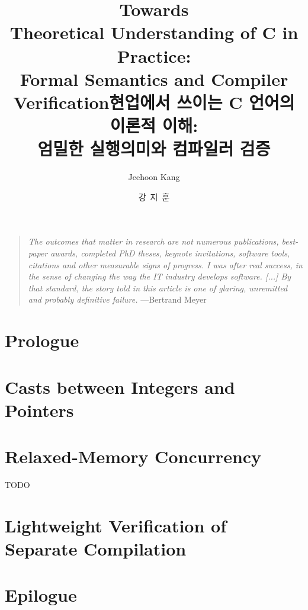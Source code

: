 \documentclass[oneside,phd]{snuthesis}
\title{Towards \\ Theoretical Understanding of C in Practice: \\ Formal Semantics and Compiler Verification}
\title*{현업에서 쓰이는 C 언어의 이론적 이해: \\ 엄밀한 실행의미와 컴파일러 검증}
\author{Jeehoon Kang}
\author*{강~지~훈} %
\begin{document}
\makefrontcover
\makefrontcover
\makeapproval

\cleardoublepage
{}



\begin{quotation}
  \emph{The outcomes that matter in research are not numerous publications, best-paper awards,
    completed PhD theses, keynote invitations, software tools, citations and other measurable signs
    of progress.  I was after real success, in the sense of changing the way the IT industry
    develops software. [...] By that standard, the story told in this article is one of glaring,
    unremitted and probably definitive failure.} \hfill{}---Bertrand Meyer~\cite{bertrand-meyer}\ \phantom{ }
\end{quotation}




\tableofcontents
\listoffigures
\listoftables

\cleardoublepage
{}




\chapter{Prologue}
\label{chap:prologue}




\chapter{Casts between Integers and Pointers}
\label{chap:intptrcast}







\chapter{Relaxed-Memory Concurrency}
\label{chap:promising}

TODO


\chapter{Lightweight Verification of \\ Separate Compilation}
\label{chap:sepcomp}









\chapter{Epilogue}
\label{chap:epilogue}







% 






\end{document}
